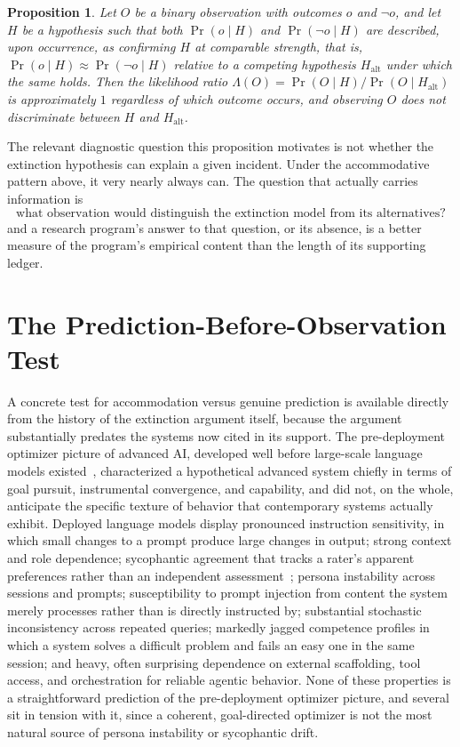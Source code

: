 \documentclass[11pt]{article}
\newtheorem{proposition}{Proposition}
\begin{document}
\begin{proposition}
Let $O$ be a binary observation with outcomes $o$ and $\neg o$, and let $H$ be a hypothesis such that both $\Pr(o \mid H) $ and $\Pr(\neg o \mid H)$ are described, upon occurrence, as confirming $H$ at comparable strength, that is, $\Pr(o \mid H) \approx \Pr(\neg o \mid H)$ relative to a competing hypothesis $H_{\text{alt}}$ under which the same holds. Then the likelihood ratio $\Lambda(O) = \Pr(O \mid H) / \Pr(O \mid H_{\text{alt}})$ is approximately $1$ regardless of which outcome occurs, and observing $O$ does not discriminate between $H$ and $H_{\text{alt}}$.
\end{proposition}

The relevant diagnostic question this proposition motivates is not whether the extinction hypothesis can explain a given incident. Under the accommodative pattern above, it very nearly always can. The question that actually carries information is
\[
\boxed{\text{what observation would distinguish the extinction model from its alternatives?}}
\]
and a research program's answer to that question, or its absence, is a better measure of the program's empirical content than the length of its supporting ledger.

\section{The Prediction-Before-Observation Test}

A concrete test for accommodation versus genuine prediction is available directly from the history of the extinction argument itself, because the argument substantially predates the systems now cited in its support. The pre-deployment optimizer picture of advanced AI, developed well before large-scale language models existed~\cite{bostrom2014,omohundro2008,yudkowskysoares2025}, characterized a hypothetical advanced system chiefly in terms of goal pursuit, instrumental convergence, and capability, and did not, on the whole, anticipate the specific texture of behavior that contemporary systems actually exhibit. Deployed language models display pronounced instruction sensitivity, in which small changes to a prompt produce large changes in output; strong context and role dependence; sycophantic agreement that tracks a rater's apparent preferences rather than an independent assessment~\cite{sharma2023sycophancy,openai2025sycophancy}; persona instability across sessions and prompts; susceptibility to prompt injection from content the system merely processes rather than is directly instructed by; substantial stochastic inconsistency across repeated queries; markedly jagged competence profiles in which a system solves a difficult problem and fails an easy one in the same session; and heavy, often surprising dependence on external scaffolding, tool access, and orchestration for reliable agentic behavior. None of these properties is a straightforward prediction of the pre-deployment optimizer picture, and several sit in tension with it, since a coherent, goal-directed optimizer is not the most natural source of persona instability or sycophantic drift.
\end{document}
